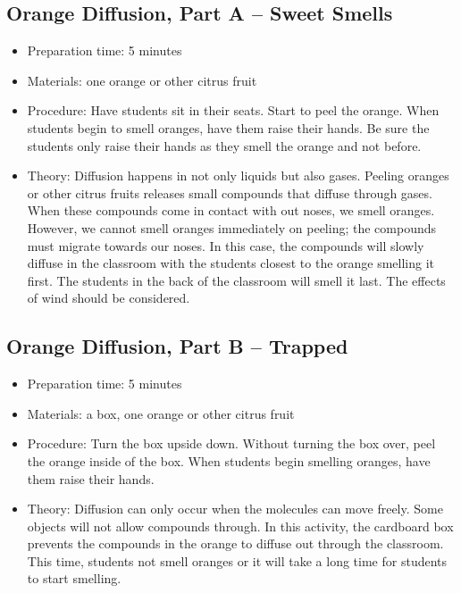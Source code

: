 \subsection{Orange Diffusion, Part A -- Sweet Smells}
\begin{itemize}
\item{Preparation time: 5 minutes}
\item{Materials: one orange or other citrus fruit}
\item{Procedure: Have students sit in their seats. Start to peel the orange. When students begin to smell oranges, have them raise their hands. Be sure the students only raise their hands as they smell the orange and not before.}
\item{Theory: Diffusion happens in not only liquids but also gases. Peeling oranges or other citrus fruits releases small compounds that diffuse through gases. When these compounds come in contact with out noses, we smell oranges. However, we cannot smell oranges immediately on peeling; the compounds must migrate towards our noses. In this case, the compounds will slowly diffuse in the classroom with the students closest to the orange smelling it first. The students in the back of the classroom will smell it last. The effects of wind should be considered.}
\end{itemize}

\subsection{Orange Diffusion, Part B -- Trapped}
\begin{itemize}
\item{Preparation time: 5 minutes}
\item{Materials: a box, one orange or other citrus fruit}
\item{Procedure: Turn the box upside down. Without turning the box over, peel the orange inside of the box. When students begin smelling oranges, have them raise their hands.}
\item{Theory: Diffusion can only occur when the molecules can move freely. Some objects will not allow compounds through. In this activity, the cardboard box prevents the compounds in the orange to diffuse out through the classroom. This time, students not smell oranges or it will take a long time for students to start smelling.}
\end{itemize}




